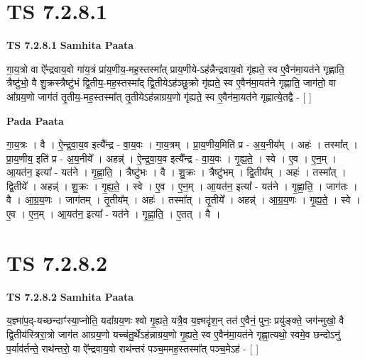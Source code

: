 \documentclass[17pt]{extarticle}
\begin{document}
\section*{ TS 7.2.8.1 }

\textbf{TS 7.2.8.1 } \newline
\textbf{Samhita Paata} \newline

गा॒य॒त्रो वा ऐ᳚न्द्रवाय॒वो गा॑य॒त्रं प्रा॑य॒णीय॒-मह॒स्तस्मा᳚त् प्राय॒णीये-ऽह॑न्नैन्द्रवाय॒वो गृ॑ह्यते॒ स्व ए॒वैन॑मा॒यत॑ने गृह्णाति॒ त्रैष्टु॑भो॒ वै शु॒क्रस्त्रैष्टु॑भं द्वि॒तीय॒-मह॒स्तस्मा᳚द् द्वि॒तीयेऽह॑ञ्छु॒क्रो गृ॑ह्यते॒ स्व ए॒वैन॑मा॒यत॑ने गृह्णाति॒ जाग॑तो॒ वा आ᳚ग्रय॒णो जाग॑तं तृ॒तीय॒-मह॒स्तस्मा᳚त् तृ॒तीयेऽह॑न्नाग्रय॒णो गृ॑ह्यते॒ स्व ए॒वैन॑मा॒यत॑ने गृह्णात्ये॒तद्वै - [  ] \newline

\textbf{Pada Paata} \newline

गा॒य॒त्रः । वै । ऐ॒न्द्र॒वा॒य॒व इत्यै᳚न्द्र - वा॒य॒वः । गा॒य॒त्रम् । प्रा॒य॒णीय॒मिति॑ प्र - अ॒य॒नीय᳚म् । अहः॑ । तस्मा᳚त् । प्रा॒य॒णीय॒ इति॑ प्र - अ॒य॒नीये᳚ । अहन्न्॑ । ऐ॒न्द्र॒वा॒य॒व इत्यै᳚न्द्र - वा॒य॒वः । गृ॒ह्य॒ते॒ । स्वे । ए॒व । ए॒न॒म् । आ॒यत॑न॒ इत्या᳚ - यत॑ने । गृ॒ह्णा॒ति॒ । त्रैष्टु॑भः । वै । शु॒क्रः । त्रैष्टु॑भम् । द्वि॒तीय᳚म् । अहः॑ । तस्मा᳚त् । द्वि॒तीये᳚ । अहन्न्॑ । शु॒क्रः । गृ॒ह्य॒ते॒ । स्वे । ए॒व । ए॒न॒म् । आ॒यत॑न॒ इत्या᳚ - यत॑ने । गृ॒ह्णा॒ति॒ । जाग॑तः । वै । आ॒ग्र॒य॒णः । जाग॑तम् । तृ॒तीय᳚म् । अहः॑ । तस्मा᳚त् । तृ॒तीये᳚ । अहन्न्॑ । आ॒ग्र॒य॒णः । गृ॒ह्य॒ते॒ । स्वे । ए॒व । ए॒न॒म् । आ॒यत॑न॒ इत्या᳚ - यत॑ने । गृ॒ह्णा॒ति॒ । ए॒तत् । वै ।  \newline




\section*{ TS 7.2.8.2 }

\textbf{TS 7.2.8.2 } \newline
\textbf{Samhita Paata} \newline

य॒ज्ञ्मा॑प॒द्-यच्छन्दाꣳ॑स्या॒प्नोति॒ यदा᳚ग्रय॒णः श्वो गृ॒ह्यते॒ यत्रै॒व य॒ज्ञ्मदृ॑श॒न् तत॑ ए॒वैनं॒ पुनः॒ प्रयु॑ङ्क्ते॒ जग॑न्मुखो॒ वै द्वि॒तीय॑स्त्रिरा॒त्रो जाग॑त आग्रय॒णो यच्च॑तु॒र्थेऽह॑न्नाग्रय॒णो गृ॒ह्यते॒ स्व ए॒वैन॑मा॒यत॑ने गृह्णा॒त्यथो॒ स्वमे॒व छन्दोऽनु॑ प॒र्याव॑र्तन्ते॒ राथ॑न्तरो॒ वा ऐ᳚न्द्रवाय॒वो राथ॑न्तरं पञ्च॒ममह॒स्तस्मा᳚त् पञ्च॒मेऽह॑ - [  ] \newline
\end{document}
